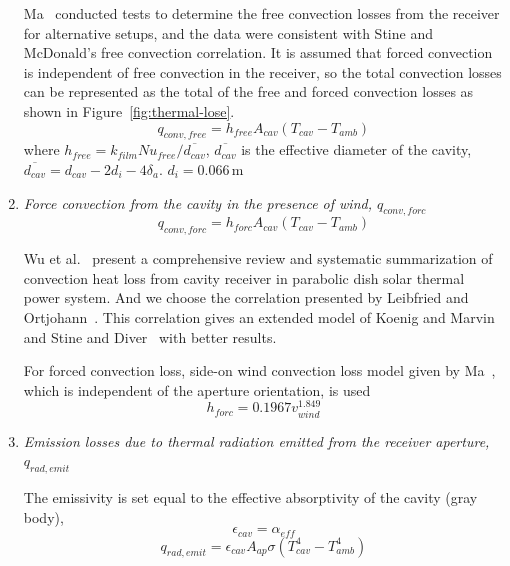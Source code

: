 \begin{enumerate}
  Ma~\cite{Ma1993} conducted tests to determine the free convection losses from the receiver for alternative setups, and the data were consistent with Stine and McDonald's free convection correlation. It is assumed that forced convection is independent of free convection in the receiver, so the total convection losses can be represented as the total of the free and forced convection losses as shown in Figure~\ref{fig:thermal-lose}.  
  \begin{equation}
	q_{conv,free} = h_{free}A_{cav}(T_{cav}-T_{amb})
\end{equation}
where $h_{free}=k_{film}Nu_{free}/\overline{d_{cav}}$, $\overline{d_{cav}}$ is the effective diameter of the cavity, $\overline{d_{cav}}=d_{cav}-2d_i-4 \delta_a$.
$d_{i}=$0.066$\,$m
  
  \item \emph{Force convection from the cavity in the presence of wind, $q_{conv,forc}$}  
  \begin{equation}
	q_{conv,forc} = h_{forc}A_{cav}(T_{cav}-T_{amb})
\end{equation}

    Wu et al.~\cite{Wu2010} present a comprehensive review and systematic summarization of convection heat loss from cavity receiver in parabolic dish solar thermal power system. And we choose the correlation presented by Leibfried and Ortjohann~\cite{Leibfried1995}. This correlation gives an extended model of Koenig and Marvin~\cite{Koenig1981} and Stine and Diver~\cite{Stine1994} with better results.

For forced convection loss, side-on wind convection loss model given by Ma~\cite{Ma1993}, which is independent of the aperture orientation, is used
\begin{equation}
	h_{forc}=0.1967v_{wind}^{1.849}
\end{equation}

  \item \emph{Emission losses due to thermal radiation emitted from the receiver aperture, $q_{rad,emit}$}
  
  The emissivity is set equal to the effective absorptivity of the cavity (gray body),
\begin{equation}
    \epsilon_{cav}=\alpha_{eff}
\end{equation}
\begin{equation}
    q_{rad,emit}=\epsilon_{cav}A_{ap}\sigma(T_{cav}^{4}-T_{amb}^{4})
\end{equation}
\end{enumerate}

